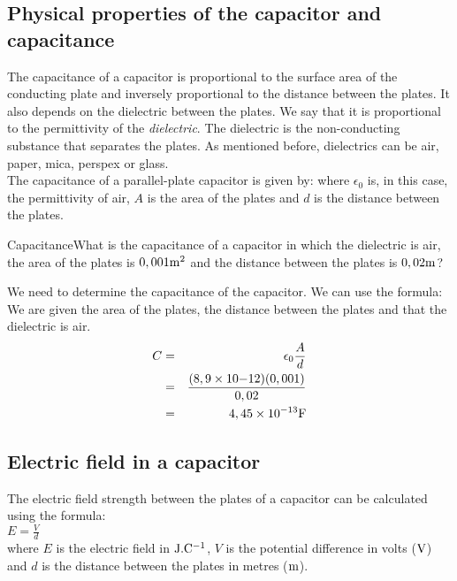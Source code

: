\subsection{Physical properties of the capacitor and capacitance}

The capacitance of a capacitor is proportional to the surface area of the
conducting plate and inversely proportional to the distance
between the plates. It also depends on the dielectric between the plates. We say that it is proportional to the permittivity of
the \textit{dielectric}. The dielectric is the non-conducting
substance that separates the plates. As mentioned before, dielectrics can be air, paper, mica, perspex
or glass.\\

The capacitance of a parallel-plate capacitor is given by:
 where $\epsilon_0$ is, in this case, the
permittivity of air, $A$ is the area of the plates and $d$ is the
distance between the plates.


\begin{wex}{Capacitance}{What is the capacitance of a capacitor in which the
dielectric is air, the area of the plates is $0,001 {\rm m^2}$ and the distance
between the plates is $0,02 {\rm m}$?}{
We need to determine the capacitance of the capacitor.
We can use the formula:
We are given the area of the plates, the distance between the plates and that the dielectric is air.
\begin{eqnarray}
C &=& \epsilon_0\frac{A}{d}\\
&=& \frac {(8,9 \times 10 {-12})(0,001)}{0,02}\\
&=& 4,45 \times 10^{-13} {\rm F}
\end{eqnarray}

}\end{wex}

\subsection{Electric field in a capacitor}

The electric field strength between the plates of a capacitor can be calculated using the formula:\\
$E = \frac{V}{d}$ \\
where $E$ is the electric field in ${\rm J.C^{-1}}$, $V$ is the potential difference in volts (${\rm V}$) and $d$ is the distance between the plates in metres (${\rm m}$).\\

